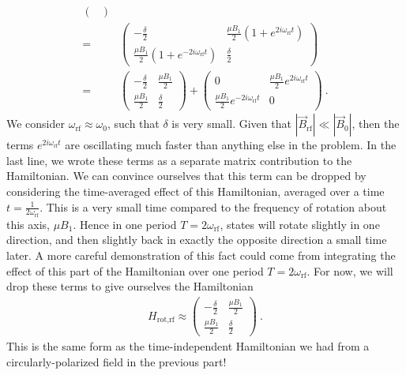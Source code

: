 \documentclass{../lab}
\begin{document}
\begin{enumerate}
\begin{enumerate}
\begin{align*}
\begin{pmatrix}
	\end{pmatrix} \\
	=&
	\begin{pmatrix}
		- \frac{\delta}{2} & \frac{\mu B_1}{2}(1 + e^{2 i \omega_\text{rf}t}) \\
		\frac{\mu B_1}{2}(1 + e^{-2 i \omega_\text{rf} t}) & \frac{\delta}{2}
	\end{pmatrix} \\
	=& 
	\begin{pmatrix}
		- \frac{\delta}{2} & \frac{\mu B_1}{2} \\
		\frac{\mu B_1}{2} & \frac{\delta}{2}
	\end{pmatrix} 
	+ 
	\begin{pmatrix}
		0 & \frac{\mu B_1}{2}e^{2 i \omega_\text{rf}t} \\
		\frac{\mu B_1}{2}e^{-2 i \omega_\text{rf} t} & 0
	\end{pmatrix}
	~.
\end{align*}
We consider $\omega_\text{rf} \approx \omega_\text{0}$, such that $\delta$ is very small. Given that $|\vec{B}_\text{rf}| \ll |\vec{B}_0|$, then the terms $e^{2 i \omega_\text{rf} t}$ are oscillating much faster than anything else in the problem. In the last line, we wrote these terms as a separate matrix contribution to the Hamiltonian. We can convince ourselves that this term can be dropped by considering the time-averaged effect of this Hamiltonian, averaged over a time $t = \frac{1}{2 \omega_\text{rf}}$. This is a very small time compared to the frequency of rotation about this axis, $\mu B_1$. Hence in one period $T = 2 \omega_\text{rf}$, states will rotate slightly in one direction, and then slightly back in exactly the opposite direction a small time later. A more careful demonstration of this fact could come from integrating the effect of this part of the Hamiltonian over one period $T = 2 \omega_\text{rf}$. For now, we will drop these terms to give ourselves the Hamiltonian
\begin{align*}
	H_\text{rot,rf}
	\approx
	\begin{pmatrix}
		- \frac{\delta}{2} & \frac{\mu B_1}{2} \\
		\frac{\mu B_1}{2} & \frac{\delta}{2}
	\end{pmatrix} 
	~.
\end{align*}
This is the same form as the time-independent Hamiltonian we had from a circularly-polarized field in the previous part!
			

\end{enumerate}
\end{enumerate}
\end{document}
